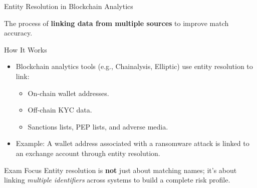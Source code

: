 \documentclass{beamer}
\begin{document}
	\begin{frame}{Entity Resolution in Blockchain Analytics}
		\begin{definition}
			The process of \textbf{linking data from multiple sources} to improve match accuracy.
		\end{definition}
		\begin{block}{How It Works}
			\begin{itemize}
				\item Blockchain analytics tools (e.g., Chainalysis, Elliptic) use entity resolution to link:
				\begin{itemize}
					\item On-chain wallet addresses.
					\item Off-chain KYC data.
					\item Sanctions lists, PEP lists, and adverse media.
				\end{itemize}
				\item Example: A wallet address associated with a ransomware attack is linked to an exchange account through entity resolution.
			\end{itemize}
		\end{block}
		\begin{alertblock}{Exam Focus}
			Entity resolution is \textbf{not} just about matching names; it's about linking \textit{multiple identifiers} across systems to build a complete risk profile.
		\end{alertblock}
	\end{frame}
	
\end{document}
